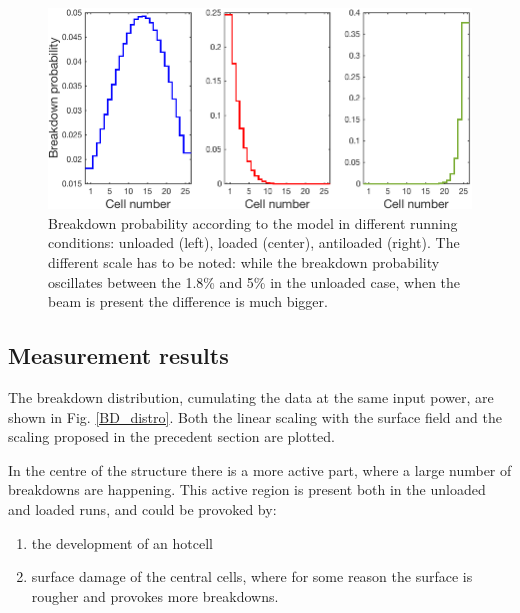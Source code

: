 \begin{figure}[h]
\centering 
\includegraphics[scale=0.45]{pictures/BD_probability.png}
\caption{Breakdown probability according to the model in different running conditions: unloaded (left), loaded (center), antiloaded (right). The different scale has to be noted: while the breakdown probability oscillates between the 1.8\% and 5\% in the unloaded case, when the beam is present the difference is much bigger.}
\label{BD_prob}
\end{figure}


\subsection[Measurement results]{Measurement results}

The breakdown distribution, cumulating the data at the same input power, are shown in Fig. \ref{BD_distro}. Both the linear scaling with the surface field and the scaling proposed in the precedent section are plotted.

In the centre of the structure there is a more active part, where a large number of breakdowns are happening. This active region is present both in the unloaded and loaded runs, and could be provoked by: 
\begin{enumerate}
\item the development of an hotcell
\item surface damage of the central cells, where for some reason the surface is rougher and provokes more breakdowns. 
\end{enumerate}

